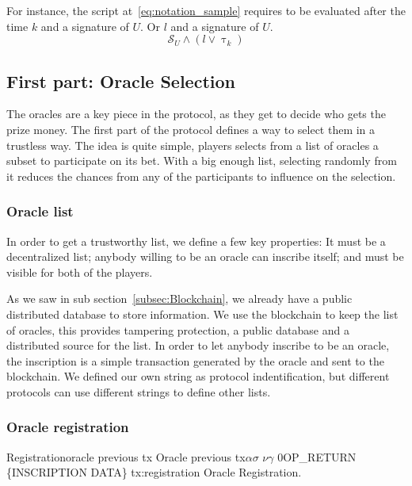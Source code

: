 For instance, the script at~\ref{eq:notation_sample} requires to be evaluated
  after the time $k$ and a signature of $U$. Or $l$ and a signature of $U$.
\begin{equation} \label{eq:notation_sample}
    \mathcal{S}_U \wedge (l \vee \uptau_k)
\end{equation}
\mathmode

\subsection{First part: Oracle Selection}

The oracles are a key piece in the protocol, as they get to decide who gets
  the prize money.
The first part of the protocol defines a way to select them in a trustless
  way.
The idea is quite simple, players selects from a list of oracles a subset
  to participate on its bet.
With a big enough list, selecting randomly from it reduces the
  chances from any of the participants to influence on the selection.

\subsubsection{Oracle list}

In order to get a trustworthy list, we define a few key properties:
It must be a decentralized list; anybody willing to be an oracle can inscribe
  itself; and must be visible for both of the players.

As we saw in sub section~\ref{subsec:Blockchain}, we already have a
  public distributed database to store information.
We use the blockchain to keep the list of oracles, this provides tampering
  protection, a public database and a distributed source for the list.
In order to let anybody inscribe to be an oracle, the inscription is a simple
 transaction generated by the oracle and sent to the blockchain.
We defined our own string as protocol indentification, but different protocols
  can use different strings to define other lists.

\subsubsection{Oracle registration}

\transaction
    {Registration}{oracle previous tx}
      {Oracle previous tx}{$\alpha$}{$\sigma$}
      \stopinputs
      {$\nu$}{$\gamma$}
      {$0$}{OP\_RETURN \{INSCRIPTION DATA\}}
      \stopoutputs
      {tx:registration}
      {Oracle Registration.}

